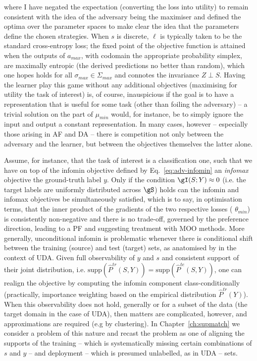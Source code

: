 %
where I have negated the expectation (converting the loss into utility) to remain consistent with
the idea of the adversary being the maximiser and defined the optima over the parameter spaces to
make clear the idea that the parameters define the chosen strategies. 
%
When \(s\) is discrete, \(\ell\) is typically taken to be the standard cross-entropy loss; the
fixed point of the objective function is attained when the outputs of \(a_{max}\), with codomain
the appropriate probability simplex, are maximally entropic (the derived predictions no better than
random), which one hopes holds for all \(\sigma_{max} \in \Sigma_{max}\) and connotes the
invariance \(Z \perp S\).
%
%
Having the learner play this game without any additional objectives (maximising for utility \wrt{}
the task of interest) is, of course, inauspicious if the goal is to have a representation that is
useful for some task (other than foiling the adversary) -- a trivial solution on the part of
\(\mu_{min}\) would, for instance, be to simply ignore the input and output a constant
representation.
%
In many cases, however -- especially those arising in \ac{AF} and \ac{DA} -- there is competition not
only between the adversary and the learner, but between the objectives themselves \wrt{} the latter
alone.
%

Assume, for instance, that the task of interest is a classification one, such that we have on top
of the infomin objective defined by Eq.~\ref{eq:adv-infomin} an \emph{infomax} objective \wrt{} the
ground-truth label \(y\).
%
Only if the condition \( \gI(S; Y) \approx 0 \) (i.e. the target labels are uniformly distributed
across \(\gS\)) holds can the infomin and infomax objectives be simultaneously satisfied, which is
to say, in optimisation terms, that the inner product of the gradients of the two respective losses
(\wrt{} \(\theta_{min}\)) is consistently non-negative and there is no trade-off, governed by the
preference direction, leading to a \ac{PF} and suggesting treatment with \ac{MOO} methods.
%
More generally, unconditional infomin is problematic whenever there is conditional shift between
the training (source) and test (target) sets, as anatomised by \cite{zhao2019learning} in the
context of \ac{UDA}. 
%
Given full observability of \(y\) and \(s\) and consistent support of their joint distribution,
i.e. \(\text{supp}(\hat{P}^{tr}(S, Y)) = \text{supp}(\hat{P}^{te}(S, Y))\), one can realign the
objective by computing the infomin component class-conditionally (practically, importance weighting
based on the empirical distribution \(\hat{P}^{tr}(Y)\)). 
%
When this observability does not hold, generally or for a subset of the data (the target domain in
the case of \ac{UDA}), then matters are complicated, however, and approximations are required (e.g by
clustering).
%
In Chapter~\ref{ch:supmatch} we consider a problem of this nature and recast the problem as one of
aligning the supports of the training -- which is systematically missing certain combinations of
\(s\) and \(y\) -- and deployment -- which is presumed unlabelled, as in \ac{UDA} -- sets.

